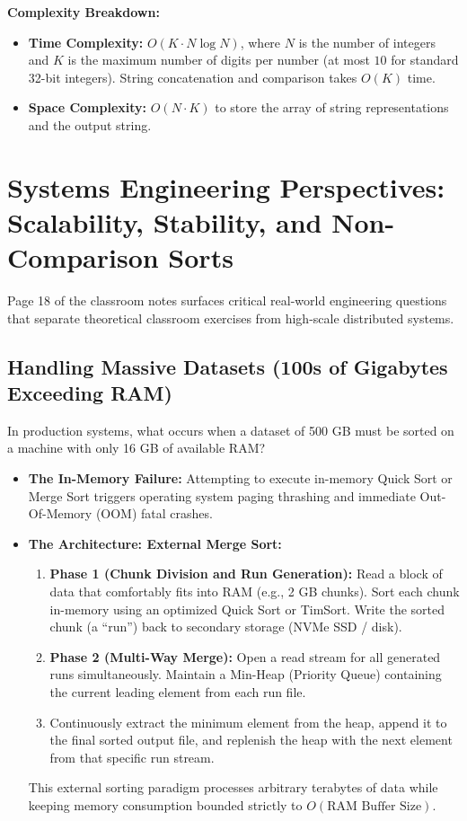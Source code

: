 \documentclass[10pt,journal,compsoc,onecolumn]{IEEEtran}
\begin{document}
\textbf{Complexity Breakdown:}
\begin{itemize}
    \item \textbf{Time Complexity:} $O(K \cdot N \log N)$, where $N$ is the number of integers and $K$ is the maximum number of digits per number (at most $10$ for standard 32-bit integers). String concatenation and comparison takes $O(K)$ time.
    \item \textbf{Space Complexity:} $O(N \cdot K)$ to store the array of string representations and the output string.
\end{itemize}

\section{Systems Engineering Perspectives: Scalability, Stability, and Non-Comparison Sorts}
\label{sec:systems}

Page 18 of the classroom notes surfaces critical real-world engineering questions that separate theoretical classroom exercises from high-scale distributed systems.

\subsection{Handling Massive Datasets (100s of Gigabytes Exceeding RAM)}

In production systems, what occurs when a dataset of 500 GB must be sorted on a machine with only 16 GB of available RAM?
\begin{itemize}
    \item \textbf{The In-Memory Failure:} Attempting to execute in-memory Quick Sort or Merge Sort triggers operating system paging thrashing and immediate Out-Of-Memory (OOM) fatal crashes.
    \item \textbf{The Architecture: External Merge Sort:}
    \begin{enumerate}
        \item \textbf{Phase 1 (Chunk Division and Run Generation):} Read a block of data that comfortably fits into RAM (e.g., 2 GB chunks). Sort each chunk in-memory using an optimized Quick Sort or TimSort. Write the sorted chunk (a ``run'') back to secondary storage (NVMe SSD / disk).
        \item \textbf{Phase 2 (Multi-Way Merge):} Open a read stream for all generated runs simultaneously. Maintain a Min-Heap (Priority Queue) containing the current leading element from each run file.
        \item Continuously extract the minimum element from the heap, append it to the final sorted output file, and replenish the heap with the next element from that specific run stream.
    \end{enumerate}
    This external sorting paradigm processes arbitrary terabytes of data while keeping memory consumption bounded strictly to $O(\text{RAM Buffer Size})$.
\end{itemize}
\end{document}
